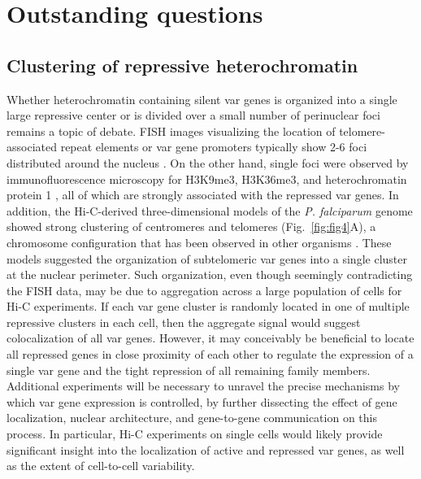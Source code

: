 \section{Outstanding questions}

\subsection{Clustering of repressive heterochromatin}

Whether heterochromatin containing silent var genes is organized into a single
large repressive center or is divided over a small number of perinuclear foci
remains a topic of debate. FISH images visualizing the location of
telomere-associated repeat elements or var gene promoters typically show 2-6
foci distributed around the nucleus \citep{lopez-rubio:genome-wide,
freitas-junior:frequent, ralph:antigenic, voss:var}. On the other hand, single
foci were observed by immunofluorescence microscopy for H3K9me3, H3K36me3, and
heterochromatin protein 1 \citep{ukaegbu:recruitment, dahan:pfsec13},
all of which are strongly associated with
the repressed var genes. In addition, the Hi-C-derived three-dimensional
models of the \textit{P. falciparum} genome showed strong clustering of centromeres and
telomeres \citep{ay:three-dimensional} (Fig.~\ref{fig:fig4}A), a
chromosome configuration that has been observed in
other organisms \citep{duan:three-dimensional, tanizawa:mapping,
umbarger:three-dimensional}. These models suggested the organization of
subtelomeric var genes into a single cluster at the nuclear perimeter. Such
organization, even though seemingly contradicting the FISH data, may be due to
aggregation across a large population of cells for Hi-C experiments. If each
var gene cluster is randomly located in one of multiple repressive clusters in
each cell, then the aggregate signal would suggest colocalization of all var
genes. However, it may conceivably be beneficial to locate all repressed genes
in close proximity of each other to regulate the expression of a single var
gene and the tight repression of all remaining family members. Additional
experiments will be necessary to unravel the precise mechanisms by which var
gene expression is controlled, by further dissecting the effect of gene
localization, nuclear architecture, and gene-to-gene communication on this
process. In particular, Hi-C experiments on single cells would likely provide
significant insight into the localization of active and repressed var genes,
as well as the extent of cell-to-cell variability. 

